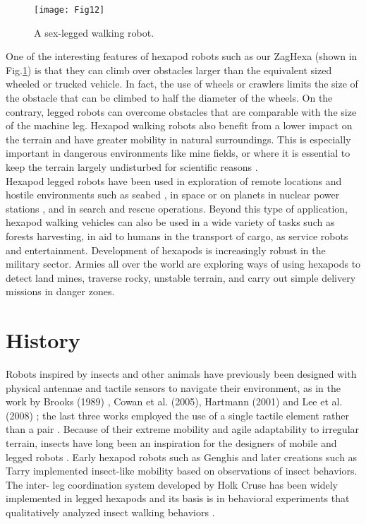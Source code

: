 \begin{figure}[h]
    \centering
    \texttt{[image: Fig12]}
    \caption{ A sex-legged walking robot.}
    \label{fig1}
\end{figure}

One of the interesting features of hexapod robots such as our ZagHexa (shown in Fig.\ref{fig1}) is that they can climb over obstacles larger than the equivalent sized wheeled or trucked vehicle. In fact, the use of wheels or crawlers limits the size of the obstacle that can be climbed to half the diameter of the wheels. On the contrary, legged robots can overcome obstacles that are comparable with the size of the machine leg\cite{2}. Hexapod walking robots also benefit from a lower impact on the terrain and have greater mobility in natural surroundings. This is especially important in dangerous environments like mine fields, or where it is essential to keep the terrain largely undisturbed for scientific reasons \cite{3}. \\

Hexapod legged robots have been used in exploration of remote locations and hostile environments such as seabed \cite{4}, in space or on planets \cite{5,6}  in nuclear power stations \cite{7}, and in search and rescue operations\cite{8}. Beyond this type of application, hexapod walking vehicles can also be used in a wide variety of tasks such as forests harvesting, in aid to humans in the transport of cargo, as service robots and entertainment. Development of hexapods is increasingly robust in the military sector. Armies all over the world are exploring ways of using hexapods to detect land mines, traverse rocky, unstable terrain, and carry out simple delivery missions in danger zones.

\section{History} 
Robots inspired by insects and other animals have previously been designed with physical antennae and tactile sensors to navigate their environment, as in the work by Brooks (1989) \cite{20,22}, Cowan et al. (2005), Hartmann (2001) \cite{27} and Lee et al. (2008) \cite{10}; the last three works employed the use of a single tactile element rather than a pair \cite{13}.
Because of their extreme mobility and agile adaptability to irregular terrain, insects have long been an inspiration for the designers of mobile and legged robots \cite{11,14}. Early hexapod robots such as Genghis and later creations such as Tarry implemented insect-like mobility based on observations of insect behaviors. The inter- leg coordination system developed by Holk Cruse \cite{30,23}  has been widely implemented   in legged hexapods and its basis is in behavioral experiments that qualitatively analyzed insect walking behaviors \cite{18}.

